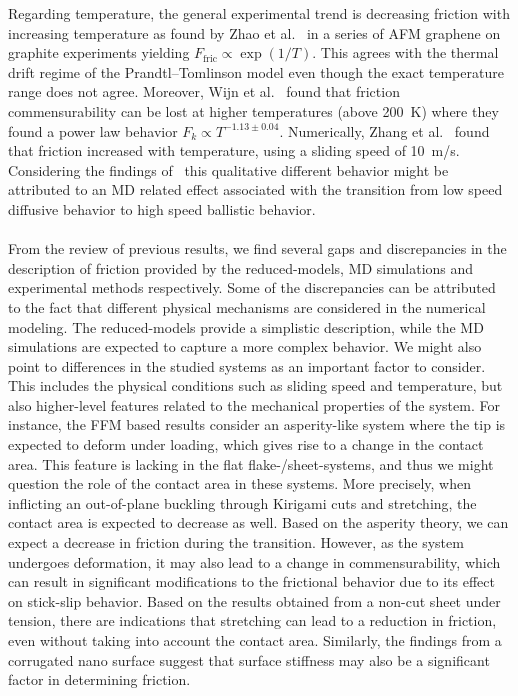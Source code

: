 Regarding temperature, the general experimental trend is decreasing friction with increasing temperature as found by Zhao et al.~\cite{zhao_thermally_2007} in a series of \acrshort{AFM} graphene on graphite experiments yielding $F_{\text{fric}} \propto \exp{(1/T)}$. This agrees with the thermal drift regime of the Prandtl–Tomlinson model even though the exact temperature range does not agree. Moreover, Wijn et al.~\cite{Wijn_2011} found that friction commensurability can be lost at higher temperatures (above \SI{200}{K}) where they found a power law behavior $F_k \propto T^{-1.13 \pm0.04}$. Numerically, Zhang et al.~\cite{ma12091425} found that friction increased with temperature, using a sliding speed of \SI{10}{m/s}. Considering the findings of~\cite{Guerra_2010} this qualitative different behavior might be attributed to an \acrshort{MD} related effect associated with the transition from low speed diffusive behavior to high speed ballistic behavior.
\\
\\
From the review of previous results, we find several gaps and discrepancies in
the description of friction provided by the reduced-models, \acrshort{MD}
simulations and experimental methods respectively. Some of the discrepancies can
be attributed to the fact that different physical mechanisms are considered in the
numerical modeling. The reduced-models provide a simplistic description, while the \acrshort{MD} simulations are expected to capture a more complex behavior. We might also point to differences in the studied systems as an
important factor to consider. This includes the physical conditions such as
sliding speed and temperature, but also higher-level features related to the
mechanical properties of the system. For instance, the \acrshort{FFM} based
results consider an asperity-like system where the tip is expected to deform
under loading, which gives rise to a change in the contact area. This feature is
lacking in the flat flake-/sheet-systems, and thus we might question the role of
the contact area in these systems. More precisely, when inflicting an
out-of-plane buckling through Kirigami cuts and stretching, the contact area is
expected to decrease as well. Based on the asperity theory, we can expect a decrease in friction during the transition. However, as the system undergoes deformation, it may also lead to a change in commensurability, which can result in significant modifications to the frictional behavior due to its effect on stick-slip behavior. Based on the results obtained from a non-cut sheet under tension, there are indications that stretching can lead to a reduction in friction, even without taking into account the contact area. Similarly, the findings from a corrugated nano surface suggest that surface stiffness may also be a significant factor in determining friction.






